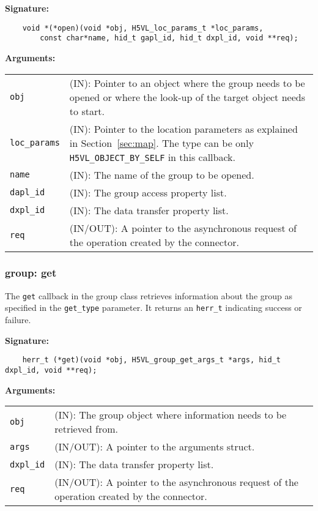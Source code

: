 \begin{mdframed}[style=bgbox]
\textbf{Signature:}
\begin{lstlisting}
    void *(*open)(void *obj, H5VL_loc_params_t *loc_params, 
        const char*name, hid_t gapl_id, hid_t dxpl_id, void **req);
\end{lstlisting}

\textbf{Arguments:}\\
\begin{tabular}{l p{13.5cm}}
  \texttt{obj} & (IN): Pointer to an object where the group needs to be
  opened or where the look-up of the target object needs to start.\\
  \texttt{loc\_params} & (IN): Pointer to the location parameters as explained in
  Section~\ref{sec:map}. The type can be only \texttt{H5VL\_OBJECT\_BY\_SELF} in this callback. \\
  \texttt{name} & (IN): The name of the group to be opened.\\
  \texttt{dapl\_id} & (IN): The group access property list.\\
  \texttt{dxpl\_id} & (IN): The data transfer property list.\\
  \texttt{req} & (IN/OUT): A pointer to the asynchronous request of the
  operation created by the connector.\\
\end{tabular}
\end{mdframed}

\subsubsection{group: get}
The \texttt{get} callback in the group class retrieves information
about the group as specified in the \texttt{get\_type} parameter. It
returns an \texttt{herr\_t} indicating success or failure.\bigskip

\begin{mdframed}[style=bgbox]
\textbf{Signature:}
\begin{lstlisting}
    herr_t (*get)(void *obj, H5VL_group_get_args_t *args, hid_t dxpl_id, void **req);
\end{lstlisting}

\textbf{Arguments:}\\
\begin{tabular}{l p{13.5cm}}
  \texttt{obj} & (IN): The group object where information needs to be
  retrieved from.\\
  \texttt{args} & (IN/OUT): A pointer to the arguments struct.\\
  \texttt{dxpl\_id} & (IN): The data transfer property list.\\
  \texttt{req} & (IN/OUT): A pointer to the asynchronous request of the
  operation created by the connector.\\
\end{tabular}
\end{mdframed}

